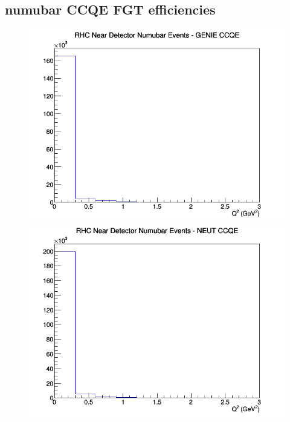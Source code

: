 \documentclass[12pt]{article}
\begin{document}
\subsection{numubar CCQE FGT efficiencies}
\begin{figure}[h]
\includegraphics[width=\linewidth]{eff_Q2/FGT/CCQE_RHC_ND_numubar_Q2_GENIE.png}
\endminipage
{}
\includegraphics[width=\linewidth]{eff_Q2/FGT/CCQE_RHC_ND_numubar_Q2_NEUT.png}
\endminipage
{}

\end{figure}
\end{document}
